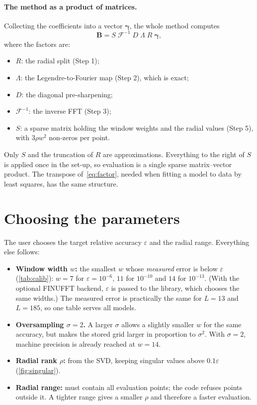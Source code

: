 \documentclass[11pt,a4paper]{article}
\theoremstyle{definition}
\newcommand{\eps}{\varepsilon}
\begin{document}
\paragraph{The method as a product of matrices.} Collecting the coefficients into a vector $\boldsymbol\gamma$, the whole method computes
\begin{equation}\label{eq:factor}
\mathbf B=S\;\mathcal F^{-1}\;D\;\Lambda\;R\;\boldsymbol\gamma ,
\end{equation}
where the factors are:
\begin{itemize}
\item $R$: the radial split (Step 1);
\item $\Lambda$: the Legendre-to-Fourier map (Step 2), which is exact;
\item $D$: the diagonal pre-sharpening;
\item $\mathcal F^{-1}$: the inverse FFT (Step 3);
\item $S$: a sparse matrix holding the window weights and the radial values (Step 5), with $3\rho w^2$ non-zeros per point.
\end{itemize}
Only $S$ and the truncation of $R$ are approximations. Everything to the right of $S$ is applied once in the set-up, so evaluation is a single
sparse matrix--vector product. The transpose of~\eqref{eq:factor}, needed when fitting a model to data by least squares, has the same structure.

\section{Choosing the parameters}\label{sec:parameters}

The user chooses the target relative accuracy $\eps$ and the radial range. Everything else follows:
\begin{itemize}
\item \textbf{Window width $w$:} the smallest $w$ whose \emph{measured} error is below $\eps$ (\cref{tab:calib}): $w=7$ for $\eps=10^{-6}$, $11$ for
  $10^{-10}$ and $14$ for $10^{-13}$. (With the optional FINUFFT backend, $\eps$ is passed to the library, which chooses the same widths.) The measured error is practically the same for $L=13$ and $L=185$, so one table serves all models.
\item \textbf{Oversampling $\sigma=2$.} A larger $\sigma$ allows a slightly smaller $w$ for the same accuracy, but makes the stored grid
  larger in proportion to $\sigma^2$. With $\sigma=2$, machine precision is already reached at $w=14$.
\item \textbf{Radial rank $\rho$:} from the SVD, keeping singular values above $0.1\eps$ (\cref{fig:singular}).
\item \textbf{Radial range:} must contain all evaluation points; the code refuses points outside it. A tighter range gives a smaller $\rho$ and
  therefore a faster evaluation.
\end{itemize}
\end{document}
